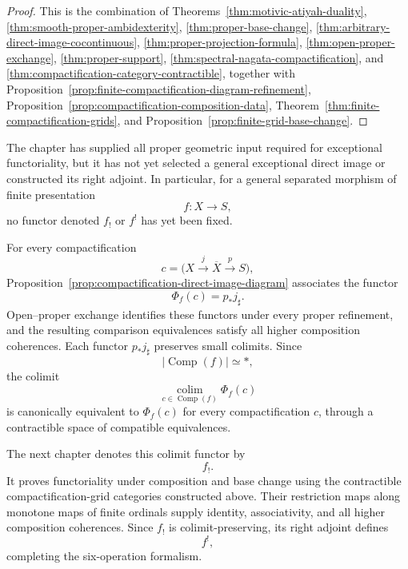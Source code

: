 \begin{proof}
This is the combination of
Theorems~\ref{thm:motivic-atiyah-duality},
\ref{thm:smooth-proper-ambidexterity},
\ref{thm:proper-base-change},
\ref{thm:arbitrary-direct-image-cocontinuous},
\ref{thm:proper-projection-formula},
\ref{thm:open-proper-exchange},
\ref{thm:proper-support},
\ref{thm:spectral-nagata-compactification}, and
\ref{thm:compactification-category-contractible}, together with
Proposition~\ref{prop:finite-compactification-diagram-refinement},
Proposition~\ref{prop:compactification-composition-data},
Theorem~\ref{thm:finite-compactification-grids}, and
Proposition~\ref{prop:finite-grid-base-change}.
\end{proof}

The chapter has supplied all proper geometric input required for exceptional
functoriality, but it has not yet selected a general exceptional direct image
or constructed its right adjoint.  In particular, for a general separated
morphism of finite presentation
\[
    f:X\longrightarrow S,
\]
no functor denoted \(f_!\) or \(f^!\) has yet been fixed.

For every compactification
\[
    c=
    \bigl(
      X\xrightarrow{j}\overline X\xrightarrow{p}S
    \bigr),
\]
Proposition~\ref{prop:compactification-direct-image-diagram}
associates the functor
\[
    \Phi_f(c)
    =
    p_*j_\sharp.
\]
Open--proper exchange identifies these functors under every proper
refinement, and the resulting comparison equivalences satisfy all higher
composition coherences.  Each functor \(p_*j_\sharp\) preserves small
colimits.  Since
\[
    \bigl|
      \operatorname{Comp}(f)
    \bigr|
    \simeq
    *,
\]
the colimit
\[
    \operatorname*{colim}_{c\in\operatorname{Comp}(f)}
    \Phi_f(c)
\]
is canonically equivalent to \(\Phi_f(c)\) for every compactification
\(c\), through a contractible space of compatible equivalences.

The next chapter denotes this colimit functor by
\[
    f_!.
\]
It proves functoriality under composition and base change using the
contractible compactification-grid categories constructed above.  Their
restriction maps along monotone maps of finite ordinals supply identity,
associativity, and all higher composition coherences.  Since \(f_!\) is
colimit-preserving, its right adjoint defines
\[
    f^!,
\]
completing the six-operation formalism.
